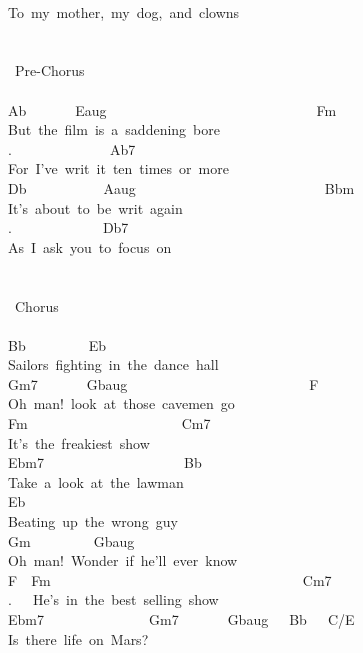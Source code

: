 {\\
To\ my\ mother,\ my\ dog,\ and\ clowns\\
\\
\\
\lbrack\ Pre-Chorus\rbrack\\
\\
Ab\ \ \ \ \ \ \ Eaug\ \ \ \ \ \ \ \ \ \ \ \ \ \ \ \ \ \ \ \ \ \ \ \ \ \ \ \ \ \ Fm\\
But\ the\ film\ is\ a\ saddening\ bore\\
.\ \ \ \ \ \ \ \ \ \ \ \ \ \ Ab7\\
For\ I've\ writ\ it\ ten\ times\ or\ more\\
Db\ \ \ \ \ \ \ \ \ \ \ Aaug\ \ \ \ \ \ \ \ \ \ \ \ \ \ \ \ \ \ \ \ \ \ \ \ \ \ \ Bbm\\
It's\ about\ to\ be\ writ\ again\\
.\ \ \ \ \ \ \ \ \ \ \ \ \ Db7\\
As\ I\ ask\ you\ to\ focus\ on\\
\\
\\
\lbrack\ Chorus\rbrack\\
\\
Bb\ \ \ \ \ \ \ \ \ Eb\\
Sailors\ fighting\ in\ the\ dance\ hall\\
Gm7\ \ \ \ \ \ \ Gbaug\ \ \ \ \ \ \ \ \ \ \ \ \ \ \ \ \ \ \ \ \ \ \ \ \ \ F\\
Oh\ man!\ look\ at\ those\ cavemen\ go\\
Fm\ \ \ \ \ \ \ \ \ \ \ \ \ \ \ \ \ \ \ \ \ \ Cm7\\
It's\ the\ freakiest\ show\\
Ebm7\ \ \ \ \ \ \ \ \ \ \ \ \ \ \ \ \ \ \ \ Bb\\
Take\ a\ look\ at\ the\ lawman\\
Eb\\
Beating\ up\ the\ wrong\ guy\\
Gm\ \ \ \ \ \ \ \ \ Gbaug\\
Oh\ man!\ Wonder\ if\ he'll\ ever\ know\\
F\ \ Fm\ \ \ \ \ \ \ \ \ \ \ \ \ \ \ \ \ \ \ \ \ \ \ \ \ \ \ \ \ \ \ \ \ \ \ \ Cm7\\
.\ \ \ He's\ in\ the\ best\ selling\ show\\
Ebm7\ \ \ \ \ \ \ \ \ \ \ \ \ \ \ Gm7\ \ \ \ \ \ \ Gbaug\ \ \ Bb\ \ \ C/E\\
Is\ there\ life\ on\ Mars?}
